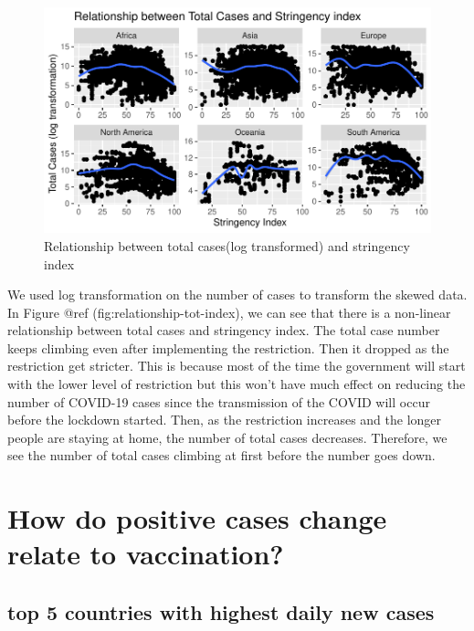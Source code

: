\documentclass[11pt,a4paper,]{article}
\begin{document}
\begin{figure}

{\centering \includegraphics{report_files/figure-latex/relationship-tot-index-1} 

}

\caption{Relationship between total cases(log transformed) and stringency index}\label{fig:relationship-tot-index}
\end{figure}

We used log transformation on the number of cases to transform the skewed data. In Figure @ref (fig:relationship-tot-index), we can see that there is a non-linear relationship between total cases and stringency index. The total case number keeps climbing even after implementing the restriction. Then it dropped as the restriction get stricter. This is because most of the time the government will start with the lower level of restriction but this won't have much effect on reducing the number of COVID-19 cases since the transmission of the COVID will occur before the lockdown started. Then, as the restriction increases and the longer people are staying at home, the number of total cases decreases. Therefore, we see the number of total cases climbing at first before the number goes down.

\clearpage

\section*{ How do positive cases change relate to vaccination?}

\subsection*{top 5 countries with highest daily new cases}
\end{document}
